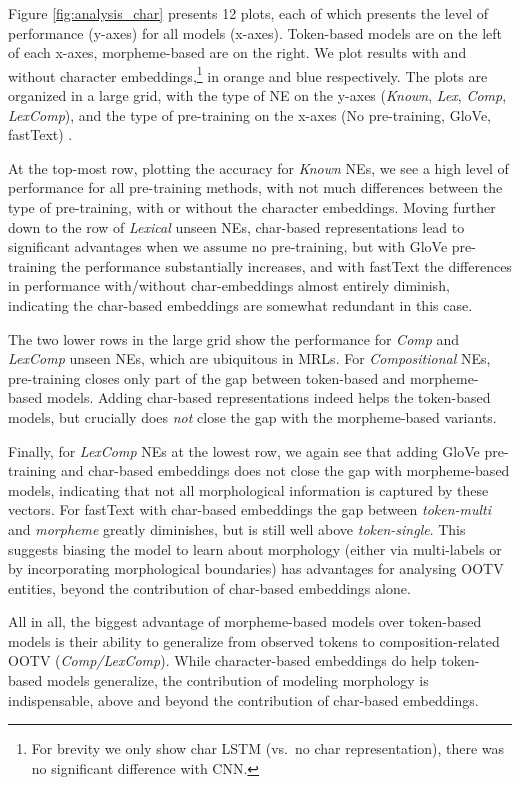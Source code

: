 \documentclass[11pt,a4paper]{article}
\newcommand{\TOKMACRO}{{\em token-single}\xspace}
\newcommand{\MULMACRO}{{\em token-multi}\xspace}
\newcommand{\MORMACRO}{{\em morpheme}\xspace}
\begin{document}
Figure \ref{fig:analysis_char} presents 12 plots, each of which  presents  the level of performance (y-axes)  for all models (x-axes). Token-based models are on the left of each x-axes, morpheme-based are on the right.  We plot results with and without character embeddings,\footnote{For brevity we only show char LSTM (vs.\ no char representation), there was no significant difference with CNN.} in orange and blue respectively. The plots are organized in a large grid, with the type of  NE  on the y-axes ({\em Known}, {\em Lex}, {\em Comp}, {\em LexComp}), and the type of  pre-training on the x-axes (No pre-training, GloVe, fastText) .  

At the top-most row, plotting the accuracy for {\em Known} NEs, we see a high level of performance for all pre-training methods, with not much differences between the type of  pre-training, with or without the  character embeddings. Moving further down to the row of  {\em Lexical} unseen NEs, char-based representations lead to significant advantages when we assume no pre-training, but with GloVe pre-training the performance substantially increases, and with fastText the differences in performance with/without char-embeddings almost entirely diminish, indicating the char-based embeddings are somewhat redundant in this case.

The two lower rows in the large  grid show the performance for {\em Comp} and {\em LexComp} unseen NEs,   which are ubiquitous in MRLs. For {\em Compositional} NEs,  pre-training closes only part of the gap between token-based and morpheme-based models. Adding char-based representations indeed {helps} the token-based models, but crucially does {\em not} close the gap with the morpheme-based variants.   

Finally, for {\em LexComp} NEs at the lowest row, we again see that adding GloVe pre-training and char-based embeddings does not close the gap with morpheme-based models, indicating that not all morphological information is  captured by these vectors. For fastText with char-based embeddings the gap between \MULMACRO  and \MORMACRO greatly diminishes, but is still well above \TOKMACRO. This suggests 
 biasing the model to learn about morphology (either via multi-labels or by incorporating morphological boundaries) has advantages for analysing OOTV entities, beyond the contribution of char-based embeddings alone.  


All in all, the biggest advantage of
morpheme-based models over token-based models is their ability to generalize from observed tokens to composition-related OOTV ({\em Comp/LexComp}).
While character-based embeddings do help token-based models  generalize, the contribution of modeling morphology is indispensable, above and beyond the  contribution of char-based embeddings.  
\end{document}
